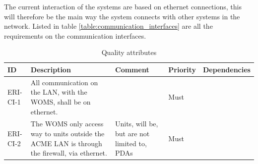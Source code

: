 The current interaction of the systems are based on ethernet connections, this will therefore be the main way the system connects with other systems in the network. Listed in table \ref{table:communication_interfaces} are all the requirements on the communication interfaces.

\begin{table}
\label{table:4_1_requirements}
\centering
\begin{tabular}{|l|p{2cm}|p{2cm}|l|l|}
\hline
ID 		& Description & Comment & Priority & Dependencies \\
\hline
ERI-CI-1& All communication on the LAN, with the WOMS, shall be on ethernet. & & Must & \\
ERI-CI-2& The WOMS only access way to units outside the ACME LAN is through the firewall, via ethernet. & Units, will be, but are not limited to, PDAs & Must & \\

\hline
\end{tabular}
\caption{Quality attributes}
\end{table}
